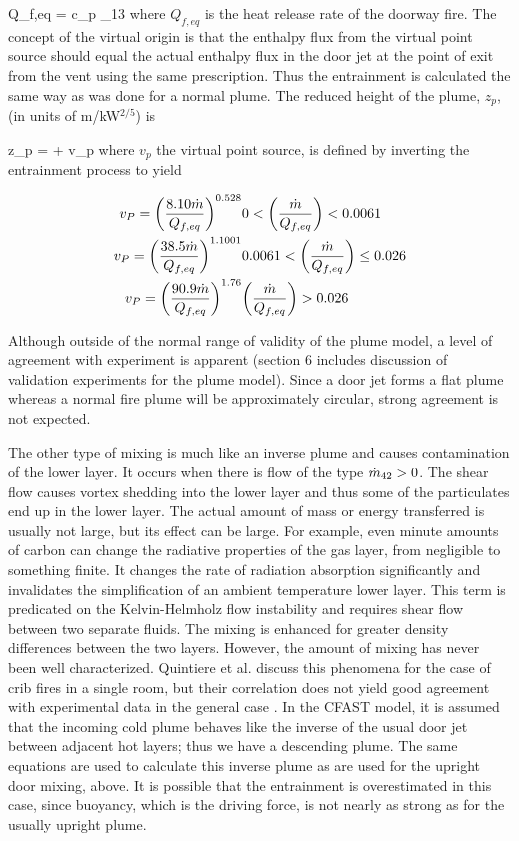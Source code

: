\be Q_{f,eq} = c_p  \dm_{13} \ee
where $Q_{f,eq}$ is the heat release rate of the doorway fire. The concept of the virtual origin is that the enthalpy flux from the virtual point source should equal the actual enthalpy flux in the door jet at the point of exit from the vent using the same prescription.  Thus the entrainment is calculated the same way as was done for a normal plume.  The reduced height of the plume, $z_p$, (in units of m/kW$^{2/5}$) is

\be z_p = + v_p \ee
where $v_p$ the virtual point source, is defined by inverting the entrainment process to yield

\begin{eqnarray}
v_P = \brackets{\frac{8.10 \dm}{Q_{f,eq}}}^{0.528} &   0 < \brackets{\frac{\dm}{Q_{f,eq}}} < 0.0061 \nonumber \\
v_P = \brackets{\frac{38.5 \dm}{Q_{f,eq}}}^{1.1001} & 0.0061 < \brackets{\frac{\dm}{Q_{f,eq}}} \leq 0.026 \\
 v_P = \brackets{\frac{90.9 \dm}{Q_{f,eq}}}^{1.76} & \brackets{\frac{\dm}{Q_{f,eq}}} > 0.026  \nonumber   \nopagebreak
\end{eqnarray}

Although outside of the normal range of validity of the plume model, a level of agreement with experiment is apparent (section 6 includes discussion of validation experiments for the plume model).  Since a door jet forms a flat plume whereas a normal fire plume will be approximately circular, strong agreement is not expected.

The other type of mixing is much like an inverse plume and causes contamination of the lower layer.  It occurs when there is flow of the type $\dot{m}_{42} > 0$.  The shear flow causes vortex shedding into the lower layer and thus some of the particulates end up in the lower layer.  The actual amount of mass or energy transferred is usually not large, but its effect can be large.  For example, even minute amounts of carbon can change the radiative properties of the gas layer, from negligible to something finite.  It changes the rate of radiation absorption significantly and invalidates the simplification of an ambient temperature lower layer.  This term is predicated on the Kelvin-Helmholz flow instability and requires shear flow between two separate fluids.  The mixing is enhanced for greater density differences between the two layers. However, the amount of mixing has never been well characterized. Quintiere et al. \cite{Quintiere:1984} discuss this phenomena for the case of crib fires in a single room, but their correlation does not yield good agreement with experimental data in the general case \cite{Quintiere:1981}.  In the CFAST model, it is assumed that the incoming cold plume behaves like the inverse of the usual door jet between adjacent hot layers; thus we have a descending plume.  The same equations are used to calculate this inverse plume as are used for the upright door mixing, above. It is possible that the entrainment is overestimated in this case, since buoyancy, which is the driving force, is not nearly as strong as for the usually upright plume.

